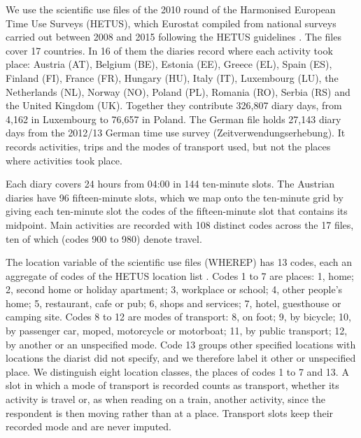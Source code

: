 \documentclass[a4paper]{article}
\begin{document}
We use the scientific use files of the 2010 round of the Harmonised European Time Use Surveys (HETUS), which Eurostat compiled from national surveys carried out between 2008 and 2015 following the HETUS guidelines \parencite{eurostatHarmonisedEuropeanTime2020}. The files cover 17 countries. In 16 of them the diaries record where each activity took place: Austria (AT), Belgium (BE), Estonia (EE), Greece (EL), Spain (ES), Finland (FI), France (FR), Hungary (HU), Italy (IT), Luxembourg (LU), the Netherlands (NL), Norway (NO), Poland (PL), Romania (RO), Serbia (RS) and the United Kingdom (UK). Together they contribute 326,807 diary days, from 4,162 in Luxembourg to 76,657 in Poland.
The German file holds 27,143 diary days from the 2012/13 German time use survey (Zeitverwendungserhebung). It records activities, trips and the modes of transport used, but not the places where activities took place.

Each diary covers 24 hours from 04:00 in 144 ten-minute slots. The Austrian diaries have 96 fifteen-minute slots, which we map onto the ten-minute grid by giving each ten-minute slot the codes of the fifteen-minute slot that contains its midpoint. Main activities are recorded with 108 distinct codes across the 17 files, ten of which (codes 900 to 980) denote travel.

The location variable of the scientific use files (WHEREP) has 13 codes, each an aggregate of codes of the HETUS location list \parencite[Annex VII/2]{eurostatHarmonisedEuropeanTime2020}. Codes 1 to 7 are places: 1, home; 2, second home or holiday apartment; 3, workplace or school; 4, other people's home; 5, restaurant, cafe or pub; 6, shops and services; 7, hotel, guesthouse or camping site. Codes 8 to 12 are modes of transport: 8, on foot; 9, by bicycle; 10, by passenger car, moped, motorcycle or motorboat; 11, by public transport; 12, by another or an unspecified mode. Code 13 groups other specified locations with locations the diarist did not specify, and we therefore label it other or unspecified place. We distinguish eight location classes, the places of codes 1 to 7 and 13. A slot in which a mode of transport is recorded counts as transport, whether its activity is travel or, as when reading on a train, another activity, since the respondent is then moving rather than at a place. Transport slots keep their recorded mode and are never imputed.
\end{document}
